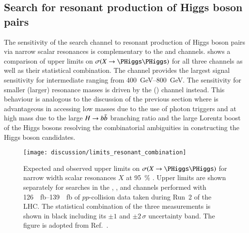 

\subsection{Search for resonant production of Higgs boson pairs}

The sensitivity of the \bbtautau search channel to resonant production
of Higgs boson pairs via narrow scalar resonances is complementary to
the \bbyy and \bbbb channels.  shows
a comparison of upper limits on $\sigma(X \to \HH)$ for all three
channels as well as their statistical combination. The \bbtautau
channel provides the largest signal sensitivity for intermediate \mX
ranging from \SIrange{400}{800}{\GeV}. The sensitivity for smaller
(larger) resonance masses is driven by the \bbyy (\bbbb) channel
instead. This behaviour is analogous to the discussion of the previous
section where \bbyy is advantageous in accessing low masses due to the
use of photon triggers and \bbbb at high mass due to the large
$H \to b\bar{b}$ branching ratio and the large Lorentz boost of the
Higgs bosons resolving the combinatorial ambiguities in constructing
the Higgs boson candidates.

\begin{figure}[htbp]
  \centering

  \texttt{[image: discussion/limits\_resonant\_combination]}

  \caption{Expected and observed upper limits on $\sigma(X \to \HH)$
    for narrow width scalar resonances $X$ at \SI{95}{\percent}
    \CLs. Upper limits are shown separately for searches in the \bbbb,
    \bbtautau, and \bbyy channels performed with
    \SIrange{126}{139}{\per\femto\barn} of $pp$-collision data taken
    during Run~2 of the LHC. The statistical combination of the three
    measurements is shown in black including its $\pm 1$ and
    $\pm 2\,\sigma$ uncertainty band. The figure is adopted from
    Ref.~\cite{ATLAS-CONF-2021-052}.}
  \label{fig:resonant_hh_comb_limits}
\end{figure}


